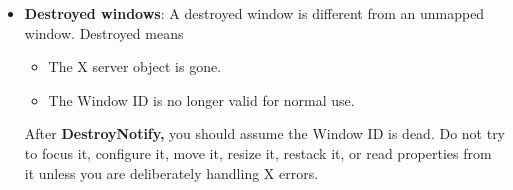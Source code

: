 \documentclass{report}
\begin{document}
\begin{itemize}
\begin{cppcode}
{                    if (focused == c)
                        focused = NULL;

                    remove_from_workspace(c);
                    remove_from_client_list(c);

                    free(c);

                    arrange();
                    focus_next_valid_client();
                }
            \end{cppcode}
            \bigbreak \noindent 
            Unmanaging should happen when the client is truly gone from the WM’s perspective. Reasons include:
            \begin{itemize}
                \item the client destroyed its top-level window,
                \item the client withdrew itself,
                \item the WM decided this window should no longer be managed,
                \item startup cleanup found stale clients.   
            \end{itemize}
            Unmanage must be idempotent in spirit. In other words, your code should be robust if multiple events arrive close together.
            \bigbreak \noindent 
            \textbf{Note:} Idempotent describes a property of certain actions or operations that yield the same exact result, regardless of whether they are executed once or multiple times. If you repeat the action, it causes no further change beyond the initial application
            \bigbreak \noindent 
            For example, a client may unmap and then destroy. If your \textbf{UnmapNotify} handler already unmanaged it, your \textbf{DestroyNotify} handler must not free the same Client again.
        \item \textbf{Destroyed windows}: A destroyed window is different from an unmapped window. Destroyed means
            \begin{itemize}
                \item The X server object is gone.
                \item The Window ID is no longer valid for normal use.
            \end{itemize}
            After \textbf{DestroyNotify,} you should assume the Window ID is dead. Do not try to focus it, configure it, move it, resize it, restack it, or read properties from it unless you are deliberately handling X errors.
            \bigbreak \noindent 

\end{itemize}
\end{document}
